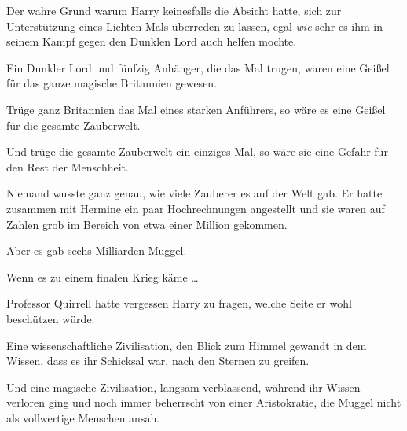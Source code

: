Der wahre Grund warum Harry keinesfalls die Absicht hatte, sich zur Unterstützung eines Lichten Mals überreden zu lassen, egal \emph{wie} sehr es ihm in seinem Kampf gegen den Dunklen Lord auch helfen mochte.

Ein Dunkler Lord und fünfzig Anhänger, die das Mal trugen, waren eine Geißel für das ganze magische Britannien gewesen.

Trüge ganz Britannien das Mal eines starken Anführers, so wäre es eine Geißel für die gesamte Zauberwelt.

Und trüge die gesamte Zauberwelt ein einziges Mal, so wäre sie eine Gefahr für den Rest der Menschheit.

Niemand wusste ganz genau, wie viele Zauberer es auf der Welt gab. Er hatte zusammen mit Hermine ein paar Hochrechnungen angestellt und sie waren auf Zahlen grob im Bereich von etwa einer Million gekommen.

Aber es gab sechs Milliarden Muggel.

Wenn es zu einem finalen Krieg käme …

Professor Quirrell hatte vergessen Harry zu fragen, welche Seite er wohl beschützen würde.

Eine wissenschaftliche Zivilisation, den Blick zum Himmel gewandt in dem Wissen, dass es ihr Schicksal war, nach den Sternen zu greifen.

Und eine magische Zivilisation, langsam verblassend, während ihr Wissen verloren ging und noch immer beherrscht von einer Aristokratie, die Muggel nicht als vollwertige Menschen ansah.

